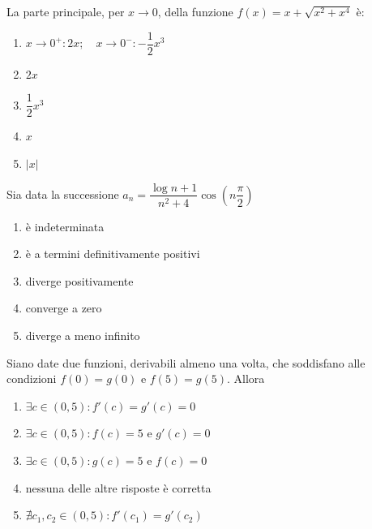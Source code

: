 \begin{quiz}
La parte principale, per $x\to0$, della funzione $f(x)=x+\sqrt{x^2+x^4}$ \`e:
\begin{enumerate}
\item $x\to0^+:2x;\quad x\to0^-:-\dfrac12x^3$
\item $2x$
\item $\dfrac12x^3$
\item $x$
\item $|x|$
\end{enumerate}
\end{quiz}

\begin{quiz}
Sia data la successione $a_n=\dfrac{\log n+1}{n^2+4}\cos\left(n\dfrac\pi2\right)$
\begin{enumerate}
\item \`e indeterminata
\item \`e a termini definitivamente positivi
\item diverge positivamente
\item converge a zero
\item diverge a meno infinito
\end{enumerate}
\end{quiz}

\begin{quiz}
Siano date due funzioni, derivabili almeno una volta, che soddisfano alle condizioni $f(0)=g(0)$ e $f(5)=g(5)$. Allora
\begin{enumerate}
\item $\exists c\in(0,5):f\prime(c)=g\prime(c)=0$
\item $\exists c\in(0,5):f(c)=5$ e $g\prime(c)=0$
\item $\exists c\in(0,5):g(c)=5$ e $f(c)=0$
\item nessuna delle altre risposte \`e corretta
\item $\nexists c_1,c_2\in(0,5):f\prime(c_1)=g\prime(c_2)$
\end{enumerate}
\end{quiz}

